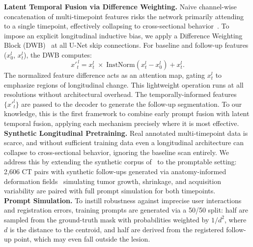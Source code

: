 \noindent\textbf{Latent Temporal Fusion via Difference Weighting.}
Naive channel-wise concatenation of multi-timepoint features risks the network primarily attending to a single timepoint, effectively collapsing to cross-sectional behavior~\cite{longiseg,denner2020spatio}. To impose an explicit longitudinal inductive bias, we apply a Difference Weighting Block (DWB)~\cite{longiseg} at all U-Net skip connections. For baseline and follow-up features ($x_0^l$, $x_t^l$), the DWB computes:
\begin{equation}
    {x'}_t^{\,l} = x_t^l \;\times\; \mathrm{InstNorm}\!\left(x_t^l - x_0^l\right) + x_t^l.
\end{equation}
The normalized feature difference acts as an attention map, gating $x_t^l$ to emphasize regions of longitudinal change. This lightweight operation runs at all resolutions without architectural overhead. The temporally-informed features $\{{x'}_t^l\}$ are passed to the decoder to generate the follow-up segmentation. To our knowledge, this is the first framework to combine early prompt fusion with latent temporal fusion, applying each mechanism precisely where it is most effective.\\


\noindent\noindent\textbf{Synthetic Longitudinal Pretraining.}
Real annotated multi-timepoint data is scarce, and without sufficient
training data even a longitudinal architecture can collapse
to cross-sectional behavior, ignoring the baseline scan entirely.
We address this by extending the synthetic corpus of~\cite{Rokuss_2025_CVPR}
to the promptable setting: 2{,}606 CT pairs with synthetic follow-ups
generated via anatomy-informed deformation fields~\cite{kovacs2023anatomy} simulating tumor
growth, shrinkage, and acquisition variability are paired with full
prompt simulation for both timepoints.\\


\noindent\textbf{Prompt Simulation.} To instill robustness against imprecise user interactions and registration errors, training prompts are generated via a 50/50 split: half are sampled from the ground-truth mask with probabilities weighted by $1/d^2$, where $d$ is the distance to the centroid, and half are derived from the registered follow-up point, which may even fall outside the lesion.

